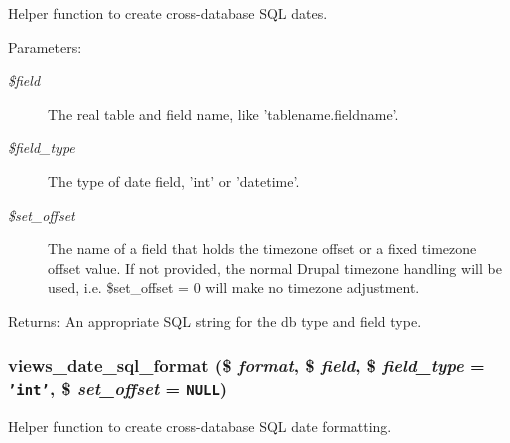 Helper function to create cross-database SQL dates.

\begin{Desc}
\item[Parameters:]
\begin{description}
\item[{\em \$field}]The real table and field name, like 'tablename.fieldname'. \item[{\em \$field\_\-type}]The type of date field, 'int' or 'datetime'. \item[{\em \$set\_\-offset}]The name of a field that holds the timezone offset or a fixed timezone offset value. If not provided, the normal Drupal timezone handling will be used, i.e. \$set\_\-offset = 0 will make no timezone adjustment. \end{description}
\end{Desc}
\begin{Desc}
\item[Returns:]An appropriate SQL string for the db type and field type. \end{Desc}
\hypertarget{handlers_8inc_7916ceb65f4cbc07601e2acae923374e}{
\subsubsection[{views\_\-date\_\-sql\_\-format}]{\setlength{\rightskip}{0pt plus 5cm}views\_\-date\_\-sql\_\-format (\$ {\em format}, \/  \$ {\em field}, \/  \$ {\em field\_\-type} = {\tt 'int'}, \/  \$ {\em set\_\-offset} = {\tt NULL})}}
\label{handlers_8inc_7916ceb65f4cbc07601e2acae923374e}


Helper function to create cross-database SQL date formatting.

